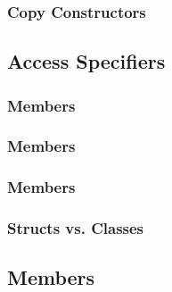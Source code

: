 \documentclass{article}
\begin{document}
\subsubsection{Copy Constructors}

\subsection{Access Specifiers}

\subsubsection{ Members}

\subsubsection{ Members}

\subsubsection{ Members}

\subsubsection{Structs vs. Classes}

\subsection{ Members}
\end{document}
